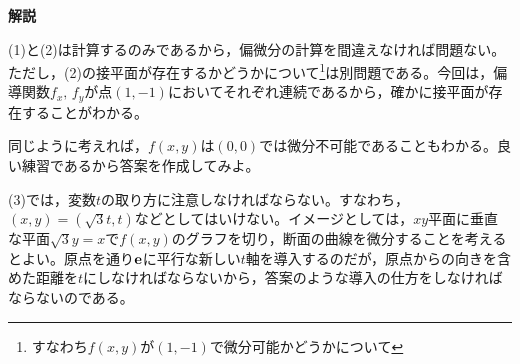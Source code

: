 \documentclass[a4paper,12pt,dvipdfmx,fleqn, oneside]{jsarticle}
\theoremstyle{defstyle}
\theoremstyle{thmx}
\theoremstyle{qesstyle}
\begin{document}
\textbf{解説}

(1)と(2)は計算するのみであるから，偏微分の計算を間違えなければ問題ない。ただし，(2)の接平面が存在するかどうかについて\footnote{すなわち$f(x,y)$が$(1,-1)$で微分可能かどうかについて}は別問題である。今回は，偏導関数$f_x,\, f_y$が点$(1,-1)$においてそれぞれ連続であるから，確かに接平面が存在することがわかる。

同じように考えれば，$f(x,y)$は$(0,0)$では微分不可能であることもわかる。良い練習であるから答案を作成してみよ。

(3)では，変数$t$の取り方に注意しなければならない。すなわち，$(x,y)=(\sqrt{3}t,t)$などとしてはいけない。イメージとしては，$xy$平面に垂直な平面$\sqrt{3}y=x$で$f(x,y)$のグラフを切り，断面の曲線を微分することを考えるとよい。原点を通り$\bf{e}$に平行な新しい$t$軸を導入するのだが，原点からの向きを含めた距離を$t$にしなければならないから，答案のような導入の仕方をしなければならないのである。
\end{document}
